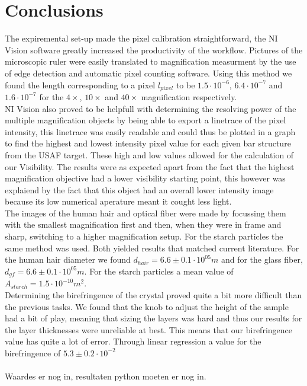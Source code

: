 \section{Conclusions}
The expiremental set-up made the pixel calibration straightforward, the NI Vision software greatly increased the productivity of the workflow. Pictures of the microscopic ruler were easily translated to magnification measurment by the use of edge detection and automatic pixel counting software. Using this method we found the length corresponding to a pixel $l_{pixel}$ to be $1.5\cdot10^{-6}$, $6.4\cdot10^{-7}$ and $1.6\cdot10^{-7}$ for the $4\times$, $10\times$ and $40\times$ magnification respectively.\\
NI Vision also proved to be helpfull with determining the resolving power of the multiple magnification objects by being able to export a linetrace of the pixel intensity, this linetrace was easily readable and could thus be plotted in a graph to find the highest and lowest intensity pixel value for each given bar structure from the USAF target. These high and low values allowed for the calculation of our Visibility. The results were as expected apart from the fact that the highest magnification objective had a lower visibility starting point, this however was explaiend by the fact that this object had an overall lower intensity image because its low numerical aperature meant it cought less light.\\
The images of the human hair and optical fiber were made by focussing them with the smallest magnification first and then, when they were in frame and sharp, switching to a higher magnification setup. For the starch particles the same method was used. Both yielded results that matched current literature. For the human hair diameter we found $d_{hair}=6.6\pm0.1\cdot10^{05} m$ and for the glass fiber, $d_{gf}=6.6\pm0.1\cdot10^{05} m$. For the starch particles a mean value of $A_{starch}=1.5\cdot10^{-10} m^2$.\\
Determining the birefringence of the crystal proved quite a bit more difficult than the previous tasks. We found that the knob to adjust the height of the sample had a bit of play, meaning that sizing the layers was hard and thus our results for the layer thicknesses were unreliable at best. This means that our birefringence value has quite a lot of error. Through linear regression a value for the birefringence of $5.3\pm0.2\cdot10^{-2}$\\
\\
Waardes er nog in, resultaten python moeten er nog in.\\
\\

